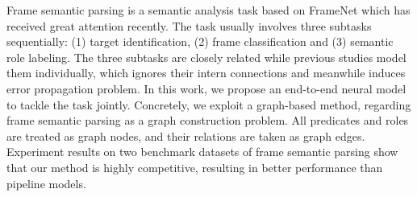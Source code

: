 Frame semantic parsing is a semantic analysis task based on FrameNet which has received great attention recently. The task usually involves three subtasks sequentially: (1) target identification, (2) frame classification and (3) semantic role labeling. The three subtasks are closely related while previous studies model them individually, which ignores their intern connections and meanwhile induces error propagation problem. In this work, we propose an end-to-end neural model to tackle the task jointly. Concretely, we exploit a graph-based method, regarding frame semantic parsing as a graph construction problem. All predicates and roles are treated as graph nodes, and their relations are taken as graph edges. Experiment results on two benchmark datasets of frame semantic parsing show that our method is highly competitive, resulting in better performance than pipeline models.
